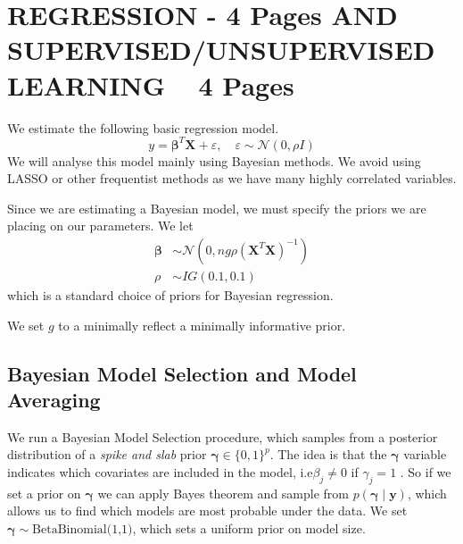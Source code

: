 \documentclass[twocolumn,10pt]{article}
\begin{document}

\section{REGRESSION - 4 Pages AND SUPERVISED/UNSUPERVISED LEARNING ~ 4 Pages}

We estimate the following basic regression model.
\[
y = \bm{\beta}^{T}\bm{X} + \varepsilon, \quad \varepsilon \sim \mathcal{N}(0, \rho I)
\]
We will analyse this model mainly using Bayesian methods. We avoid using LASSO or other frequentist methods as
we have many highly correlated variables. %

Since we are estimating a Bayesian model, we must specify the priors we are placing on our parameters.
We let
\begin{align*}
    \bm{\beta} &\sim \mathcal{N}(0, ng \rho (\bm{X}^{T}\bm{X})^{-1}) \\
    \rho &\sim IG(0.1, 0.1)
\end{align*}
which is a standard choice of priors for Bayesian regression.

We set $g$ to a minimally reflect a minimally informative prior.

\subsection{Bayesian Model Selection and Model Averaging}

We run a Bayesian Model Selection procedure, which samples from a posterior distribution of a \emph{spike and slab} prior $\bm{\gamma} \in \{0,1\}^{p}$.
The idea is that the $\bm{\gamma}$ variable indicates which covariates are included in the model, i.e\;\;$\beta_j \neq 0$ if $\gamma_j = 1$ . So if we set a prior on $\bm{\gamma}$ we can apply Bayes theorem and sample from $p(\bm{\gamma} \;|\; \mathbf{y})$, which allows us to find which models are most probable under the data.
We set $\bm{\gamma} \sim \text{BetaBinomial(1,1)}$, which sets a uniform prior on model size. %
\end{document}
